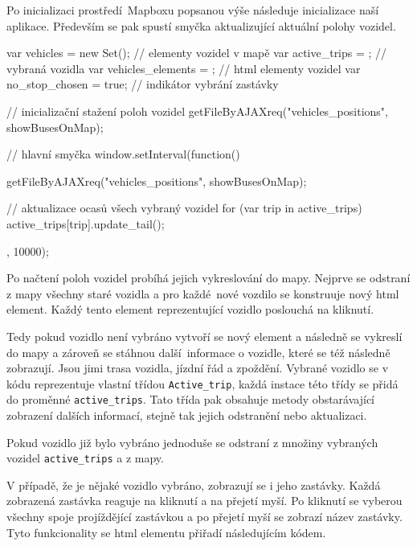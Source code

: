 \bigbreak

Po inicializaci prostředí Mapboxu popsanou výše následuje inicializace naší aplikace. Především se pak spustí smyčka aktualizující aktuální polohy vozidel.

\begin{code}[frame=none]
var vehicles = new Set(); // elementy vozidel v mapě
var active_trips = {}; // vybraná vozidla
var vehicles_elements = {}; // html elementy vozidel
var no_stop_chosen = true; // indikátor vybrání zastávky

// inicializační stažení poloh vozidel
getFileByAJAXreq("vehicles_positions", showBusesOnMap);

// hlavní smyčka
window.setInterval(function(){
getFileByAJAXreq("vehicles_positions", showBusesOnMap);

// aktualizace ocasů všech vybraný vozidel
for (var trip in active_trips){
  active_trips[trip].update_tail();
}
}, 10000);
\end{code}

Po načtení poloh vozidel probíhá jejich vykreslování do mapy. Nejprve se odstraní z mapy všechny staré vozidla a pro každé nové vozdilo se konstruuje nový \gls{html} element. Každý tento element reprezentující vozidlo poslouchá na kliknutí.

\bigbreak

Tedy pokud vozidlo není vybráno vytvoří se nový element a následně se vykreslí do mapy a zároveň se stáhnou další informace o vozidle, které se též následně zobrazují. Jsou jimi trasa vozidla, jízdní řád a zpoždění. Vybrané vozidlo se v kódu reprezentuje vlastní třídou \verb-Active_trip-, každá instace této třídy se přidá do proměnné \verb-active_trips-. Tato třída pak obsahuje metody obstarávající zobrazení dalších informací, stejně tak jejich odstranění nebo aktualizaci.

\bigbreak

Pokud vozidlo již bylo vybráno jednoduše se odstraní z množiny vybraných vozidel \verb-active_trips- a z mapy.

\bigbreak

V případě, že je nějaké vozidlo vybráno, zobrazují se i jeho zastávky. Každá zobrazená zastávka reaguje na kliknutí a na přejetí myší. Po kliknutí se vyberou všechny spoje projíždějící zastávkou a po přejetí myší se zobrazí název zastávky. Tyto funkcionality se \gls{html} elementu přiřadí následujícím kódem.

